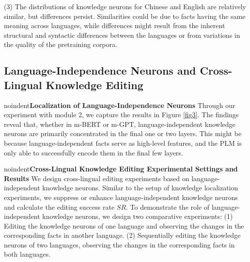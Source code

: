 \documentclass[]{article}
\newcommand{\vpara}[1]{noindent\textbf{#1 }}%
\begin{document}
(3) The distributions of knowledge neurons for Chinese and English are relatively similar, but differences persist. Similarities could be due to facts having the same meaning across languages, while differences might result from the inherent structural and syntactic differences between the languages or from variations in the quality of the pretraining corpora.
\begin{table}
\centering
{}
\caption{Results of the localization of knowledge neurons. B-KN is the baseline method, the symbol ``\textuparrow" indicates the increase in success rate compared to B-KN for our method, which can be expressed as: $\frac{{\text{AMIG}-\text{B-KN}}}{{\text{B-KN}}}$, and bold indicates the method with a higher $SR$.}
\label{table1}
\end{table}


\subsection{Language-Independence Neurons and Cross-Lingual Knowledge Editing}
\vpara{Localization of Language-Independence Neurons}
Through our experiment with module 2, we capture the results in Figure \ref{fig3}. The findings reveal that, whether in m-BERT or m-GPT, language-independent knowledge neurons are primarily concentrated in the final one or two layers.
This might be because language-independent facts serve as high-level features, and the PLM is only able to successfully encode them in the final few layers.

\vpara{Cross-Lingual Knowledge Editing Experimental Settings and Results}
We design cross-lingual editing experiments based on language-independent knowledge neurons. Similar to the setup of knowledge localization experiments, we suppress or enhance language-independent knowledge neurons and calculate the editing success rate \( SR \). To demonstrate the role of language-independent knowledge neurons, we design two comparative experiments:
(1) Editing the knowledge neurons of one language and observing the changes in the corresponding facts in another language.
(2) Sequentially editing the knowledge neurons of two languages, observing the changes in the corresponding facts in both languages.
\end{document}
